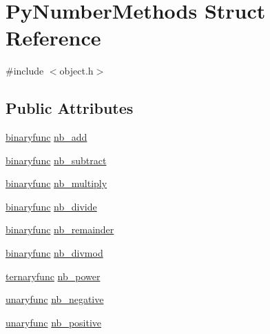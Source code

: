 \hypertarget{struct_py_number_methods}{}\section{Py\+Number\+Methods Struct Reference}
\label{struct_py_number_methods}


{\ttfamily \#include $<$object.\+h$>$}

\subsection*{Public Attributes}
\begin{DoxyCompactItemize}
\item 
\mbox{\hyperlink{_python27_2object_8h_a1a50b2d154f36acb9d215f2cdc1561a8}{binaryfunc}} \mbox{\hyperlink{struct_py_number_methods_ada624d95704d8ec3491a6e6473b5c6af}{nb\+\_\+add}}
\item 
\mbox{\hyperlink{_python27_2object_8h_a1a50b2d154f36acb9d215f2cdc1561a8}{binaryfunc}} \mbox{\hyperlink{struct_py_number_methods_aa92ce9adbe4345ed779e32fbec1633b9}{nb\+\_\+subtract}}
\item 
\mbox{\hyperlink{_python27_2object_8h_a1a50b2d154f36acb9d215f2cdc1561a8}{binaryfunc}} \mbox{\hyperlink{struct_py_number_methods_a6c2361df75359a95de536c0bba3b0ebc}{nb\+\_\+multiply}}
\item 
\mbox{\hyperlink{_python27_2object_8h_a1a50b2d154f36acb9d215f2cdc1561a8}{binaryfunc}} \mbox{\hyperlink{struct_py_number_methods_a6d710102166e75368fa05f4bc818f6a7}{nb\+\_\+divide}}
\item 
\mbox{\hyperlink{_python27_2object_8h_a1a50b2d154f36acb9d215f2cdc1561a8}{binaryfunc}} \mbox{\hyperlink{struct_py_number_methods_ac5faf4e85e1044648b75d87b980810f6}{nb\+\_\+remainder}}
\item 
\mbox{\hyperlink{_python27_2object_8h_a1a50b2d154f36acb9d215f2cdc1561a8}{binaryfunc}} \mbox{\hyperlink{struct_py_number_methods_a993851f9a4d1ad172b8d3cf94382cb20}{nb\+\_\+divmod}}
\item 
\mbox{\hyperlink{_python27_2object_8h_a3304ec7aa95ae9f0141c3b04e20f8394}{ternaryfunc}} \mbox{\hyperlink{struct_py_number_methods_a41e3d866693e4d036b8f6c19e005d2e0}{nb\+\_\+power}}
\item 
\mbox{\hyperlink{_python27_2object_8h_aeda2d77a292fdf2c686151d24b3dbf5a}{unaryfunc}} \mbox{\hyperlink{struct_py_number_methods_a0a4cb6e0aa1d4f2846ad198931c53af0}{nb\+\_\+negative}}
\item 
\mbox{\hyperlink{_python27_2object_8h_aeda2d77a292fdf2c686151d24b3dbf5a}{unaryfunc}} \mbox{\hyperlink{struct_py_number_methods_adca8072483c63243de4d26d0575e6e8d}{nb\+\_\+positive}}

\end{DoxyCompactItemize}
